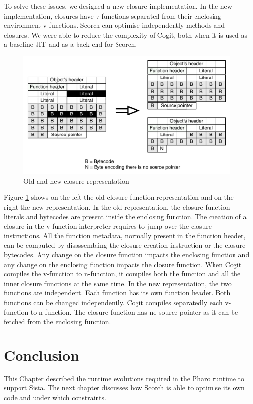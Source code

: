 \documentclass[a4paper,12pt,twoside]{../includes/ThesisStyle}
\begin{document}
To solve these issues, we designed a new closure implementation. In the new implementation, closures have v-functions separated from their enclosing environment v-functions. Scorch can optimise independently methods and closures. We were able to reduce the complexity of Cogit, both when it is used as a baseline JIT and as a back-end for Scorch.

\begin{figure}[h!]
    \begin{center}
        \includegraphics[width=0.85\linewidth]{CompiledBlock}
        \caption{Old and new closure representation}
        \label{fig:CompiledBlock}
    \end{center}
\end{figure}

Figure \ref{fig:CompiledBlock} shows on the left the old closure function representation and on the right the new representation. In the old representation, the closure function literals and bytecodes are present inside the enclosing function. The creation of a closure in the v-function interpreter requires to jump over the closure instructions. All the function metadata, normally present in the function header, can be computed by disassembling the closure creation instruction or the closure bytecodes. Any change on the closure function impacts the enclosing function and any change on the enclosing function impacts the closure function. When Cogit compiles the v-function to n-function, it compiles both the function and all the inner closure functions at the same time. In the new representation, the two functions are independent. Each function has its own function header. Both functions can be changed independently. Cogit compiles separatedly each v-function to n-function. The closure function has no source pointer as it can be fetched from the enclosing function.

\section*{Conclusion}

This Chapter described the runtime evolutions required in the Pharo runtime to support Sista. The next chapter discusses how Scorch is able to optimise its own code and under which constraints.

\ifx\wholebook\relax\else
    
\end{document}
